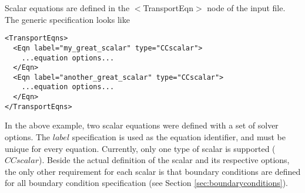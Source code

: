 Scalar equations are defined in the $<$TransportEqn$>$ node of the input file.  The generic specification looks like
%
\begin{Verbatim}[fontsize=\footnotesize]
<TransportEqns>
  <Eqn label="my_great_scalar" type="CCscalar">
  	...equation options...
  </Eqn>
  <Eqn label="another_great_scalar" type="CCscalar">
  	...equation options...
  </Eqn>
</TransportEqns>
\end{Verbatim}
%
In the above example, two scalar equations were defined with a set of solver options. The $label$ specification is used as the equation identifier, and must be unique for every equation.  Currently, only one type of scalar is supported ($CCscalar$). Beside the actual definition of the scalar and its respective options, the only other requirement for each scalar is that boundary conditions are defined for all boundary condition specification (see Section \ref{sec:boundaryconditions}). 


